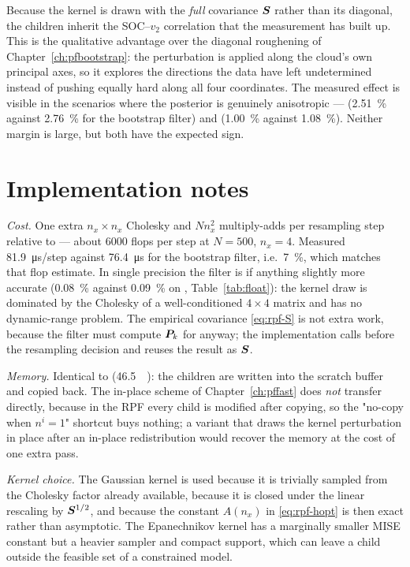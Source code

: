 Because the kernel is drawn with the \emph{full} covariance $\bm{S}$ rather than its diagonal, the
children inherit the SOC--$v_2$ correlation that the measurement has built up.  This is the
qualitative advantage over the diagonal roughening of Chapter~\ref{ch:pfbootstrap}: the perturbation
is applied along the cloud's own principal axes, so it explores the directions the data have left
undetermined instead of pushing equally hard along all four coordinates.  The measured effect is
visible in the scenarios where the posterior is genuinely anisotropic --- 
(\SI{2.51}{\percent} against \SI{2.76}{\percent} for the bootstrap filter) and 
(\SI{1.00}{\percent} against \SI{1.08}{\percent}).  Neither margin is large, but both have the
expected sign.

\section{Implementation notes}
\emph{Cost.}  One extra $n_x\times n_x$ Cholesky and $N n_x^2$ multiply-adds per resampling step
relative to  --- about \num{6000} flops per step at $N=500$, $n_x=4$.
Measured \SI{81.9}{\micro\second}/step against \SI{76.4}{\micro\second} for the bootstrap filter,
i.e.\ \SI{7}{\percent}, which matches that flop estimate.  In single precision the filter is if
anything slightly more accurate (\SI{0.08}{\percent} against \SI{0.09}{\percent} on ,
Table~\ref{tab:float}): the kernel draw is dominated by the Cholesky of a well-conditioned
$4\times4$ matrix and has no dynamic-range problem.  The empirical covariance \eqref{eq:rpf-S} is not extra work, because the
filter must compute $\bm{P}_k$ for  anyway; the implementation calls
 before the resampling decision and reuses the result as $\bm{S}$.

\emph{Memory.}  Identical to  (\SI{46.5}{\kilo\byte}): the children are
written into the scratch buffer and copied back.  The in-place scheme of Chapter~\ref{ch:pffast}
does \emph{not} transfer directly, because in the RPF every child is modified after copying, so the
"no-copy when $n^i=1$" shortcut buys nothing; a variant that draws the kernel perturbation in place
after an in-place redistribution would recover the memory at the cost of one extra pass.

\emph{Kernel choice.}  The Gaussian kernel is used because it is trivially sampled from the
Cholesky factor already available, because it is closed under the linear rescaling by $\bm{S}^{1/2}$,
and because the constant $A(n_x)$ in \eqref{eq:rpf-hopt} is then exact rather than asymptotic.  The
Epanechnikov kernel has a marginally smaller MISE constant but a heavier sampler and compact
support, which can leave a child outside the feasible set of a constrained model.

